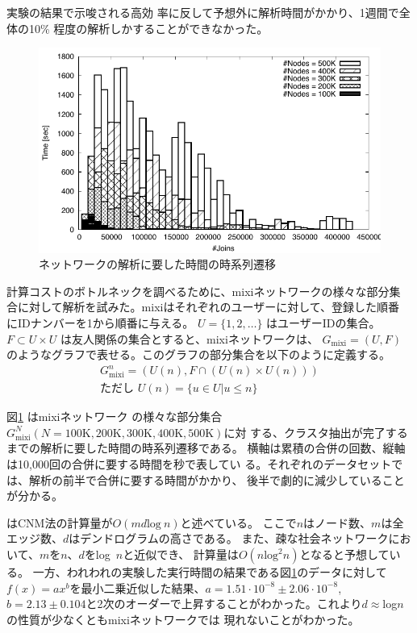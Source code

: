 \documentclass [a4j,11pt] {jsarticle}
\begin{document}
実験の結果\cite{clauset-2004-finding-community-structure-in-very-large}で示唆される高効
率に反して予想外に解析時間がかかり、1週間で全体の10\%
程度の解析しかすることができなかった。

\begin {figure}[htbp]
  \centerline {\includegraphics [width=0.80\linewidth]{fig2-cnm-joins-time-series.pdf}}
  \caption {ネットワークの解析に要した時間の時系列遷移}
  \label {fig: newman time diff}
\end{figure}

計算コストのボトルネックを調べるために、mixiネットワークの様々な部分集
合に対して解析を試みた。mixiはそれぞれのユーザーに対して、登録した順番
にIDナンバーを1から順番に与える。
$U= \{1,2,\ldots\}$
はユーザーIDの集合。
$F \subset U\times U$
は友人関係の集合とすると、mixiネットワークは、
$G_{\text {mixi}} = (U, F)$
のようなグラフで表せる。このグラフの部分集合を以下のように定義する。
%
\begin {align*}
  G_{\text {mixi}}^n = (U(n), F \cap (U(n) \times U(n))) \\
  \text {ただし } U(n) = \{ u \in U | u \le n \}
\end {align*}

図\ref {fig: newman time diff} はmixiネットワーク
の様々な部分集合$G_{\text {mixi}}^N (N = \text {100K}, \text {200K},
\text {300K}, \text {400K}, \text {500K})$に対
する、クラスタ抽出が完了するまでの解析に要した時間の時系列遷移である。
横軸は累積の合併の回数、縦軸は10,000回の合併に要する時間を秒で表してい
る。それぞれのデータセットでは、解析の前半で合併に要する時間がかかり、
後半で劇的に減少していることが分かる。

\cite{clauset-2004-finding-community-structure-in-very-large}
はCNM法の計算量が$O(md\text{log}~n)$と述べている。
ここで$n$はノード数、$m$は全エッジ数、$d$はデンドログラムの高さである。
また、疎な社会ネットワークにおいて、$m$を$n$、$d$をlog~$n$と近似でき、
計算量は$O(n\text{log}^2 n)$となると予想している。
一方、われわれの実験した実行時間の結果である図\ref{fig: newman time diff}のデータに対して
$f(x) = ax^b$を最小二乗近似した結果、$a = 1.51\cdot10^{-8} \pm2.06\cdot10^{-8}$,
$b = 2.13\pm0.104$と2次のオーダーで上昇することがわかった。これより$d\approx$log$n$の性質が少なくともmixiネットワークでは
現れないことがわかった。
\end{document}
